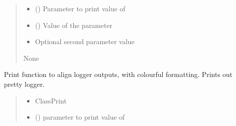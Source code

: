 \documentclass[letterpaper,10pt,english]{sphinxmanual}
\begin{document}
\begin{fulllineitems}
\begin{fulllineitems}
\begin{quote}
\begin{description}
\begin{itemize}
\item {} 
\sphinxAtStartPar
{} () \textendash{} Parameter to print value of

\item {} 
\sphinxAtStartPar
{} () \textendash{} Value of the parameter

\item {} 
\sphinxAtStartPar
{} \textendash{} Optional second parameter value

\end{itemize}

\sphinxAtStartPar
None

\end{description}\end{quote}

\end{fulllineitems}


\begin{fulllineitems}
\label{\detokenize{api/killMS.Other:killMS.Other.ClassPrint.ClassPrint.Print2}}
\pysigstartsignatures
{}
\pysigstopsignatures
\sphinxAtStartPar
Print function to align logger outputs, with colourful formatting.
Prints out pretty logger.
\begin{quote}\begin{description}
\begin{itemize}
\item {} 
\sphinxAtStartPar
{} \textendash{} ClassPrint

\item {} 
\sphinxAtStartPar
{} () \textendash{} parameter to print value of


\end{itemize}
\end{description}
\end{quote}
\end{fulllineitems}
\end{fulllineitems}
\end{document}
